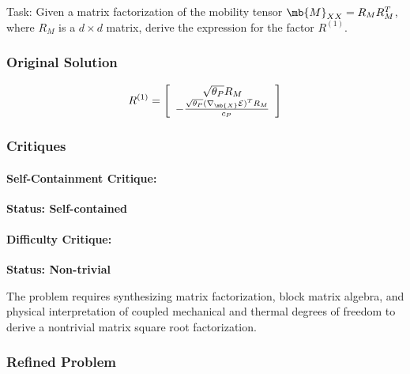 \documentclass[10pt]{article}
\begin{document}
Task:
Given a matrix factorization of the mobility tensor $\mb{M}_{\tiny XX} = R_M R_M^T$, where $R_M$ is a $d \times d$ matrix, derive the expression for the factor $R^{(1)}$.

\subsubsection*{Original Solution}
\[ R^{(1)} = \left[
\begin{array}{c}
\sqrt{\theta_P}R_M \\
-\frac{\sqrt{\theta_P}(\nabla_{\mb{X}} \mathcal{E})^T R_M}{c_P}
\end{array}
\right] \]

\subsubsection*{Critiques}
\paragraph*{Self-Containment Critique:}
\textcolor{pass}{\textbf{Status: Self-contained}}




\paragraph*{Difficulty Critique:}
\textcolor{pass}{\textbf{Status: Non-trivial}}

The problem requires synthesizing matrix factorization, block matrix algebra, and physical interpretation of coupled mechanical and thermal degrees of freedom to derive a nontrivial matrix square root factorization.


\subsubsection*{Refined Problem}
\end{document}
